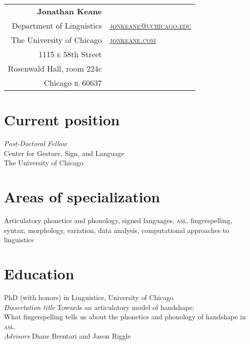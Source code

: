 \documentclass[10pt, letterpaper]{article}
\newcommand{\years}[1]{\marginpar{\scriptsize #1}}
\begin{document}
\thispagestyle{empty} %
\reversemarginpar
\raggedright

\begin{table}[!t]
  \begin{tabular*}{6.5in}{r|l}
    \hspace{3in}\textbf{\LARGE\sffamily Jonathan Keane}  &\\
Department of Linguistics & \href{mailto:jonkeane@uchicago.edu}{\textsc{jonkeane@uchicago.edu}}\\
  The University of Chicago & \href{http://jonkeane.com}{\textsc{jonkeane.com}}\\
1115 \textsc{e} 58th Street & \\
Rosenwald Hall, room 224c & \\
    Chicago \textsc{il} 60637 & \\
  \end{tabular*}
\end{table}
\setlength\parindent{0in}
\setlength\parskip{0ex}
\section*{Current position}
\emph{Post-Doctoral Fellow}\\ Center for Gesture, Sign, and Language\\ The University of Chicago\\

\section*{Areas of specialization}
Articulatory phonetics and phonology, signed languages, \textsc{asl}, fingerspelling, syntax, morphology, variation, data analysis, computational approaches to linguistics


\section*{Education}
\-\years{2014}PhD (with honors) in Linguistics, University of Chicago \\
\hspace{2em} \textit{Dissertation title} Towards an articulatory model of handshape:\\
\hspace{4em}What fingerspelling tells us about the phonetics and phonology of handshape in \textsc{asl}.\\
\hspace{2em} \textit{Advisors} Diane Brentari and Jason Riggle
\end{document}
